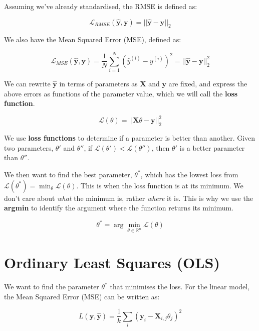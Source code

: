 Assuming we've already standardised, the RMSE is defined as:

\begin{equation}
    \mathcal{L}_{RMSE}(\hat{\bm{y}}, \bm{y}) = ||\hat{\bm{y}} - \bm{y}||_2
\end{equation}

We also have the Mean Squared Error (MSE), defined as:

\begin{equation}
    \mathcal{L}_{MSE}(\hat{\bm{y}}, \bm{y}) =  \frac{1}{N}\sum_{i=1}^{N} (\hat{y}^{(i)} - y^{(i)})^2 = ||\hat{\bm{y}} - \bm{y}||_2^2
\end{equation}

We can rewrite $\hat{\bm{y}}$ in terms of parameters as $\bm{X}$ and $\bm{y}$ are fixed, and express the above errors as functions of the parameter value, which we will call the \textbf{loss function}.

\begin{equation}
    \mathcal{L}(\theta) = ||\bm{X} \theta - \bm{y}||_2^2
\end{equation}

We use \textbf{loss functions} to determine if a parameter is better than another. Given two parameters, $\theta'$ and $\theta''$, if $\mathcal{L}(\theta') < \mathcal{L}(\theta'')$, then $\theta'$ is a better parameter than $\theta''$. \bigskip

We then want to find the best parameter, $\theta^*$, which has the lowest loss from $\mathcal{L}(\theta^*) = \min_{\theta} \mathcal{L}(\theta)$. This is when the loss function is at its minimum. We don't care about \textit{what} the minimum is, rather \textit{where} it is. This is why we use the \textbf{argmin} to identify the argument where the function returns its minimum.

\begin{equation}
    \theta^* = \arg\min_{\theta \in \mathbb{R}^n} \mathcal{L}(\theta)
\end{equation}


\section{Ordinary Least Squares (OLS)}

We want to find the parameter \( \theta^* \) that minimises the loss. For the linear model, the Mean Squared Error (MSE) can be written as:

\[
    L(\bm{y}, \hat{\bm{y}}) = \frac{1}{k} \sum_i (\bm{y}_i - \bm{X}_{i,j} \theta_j)^2
\]

